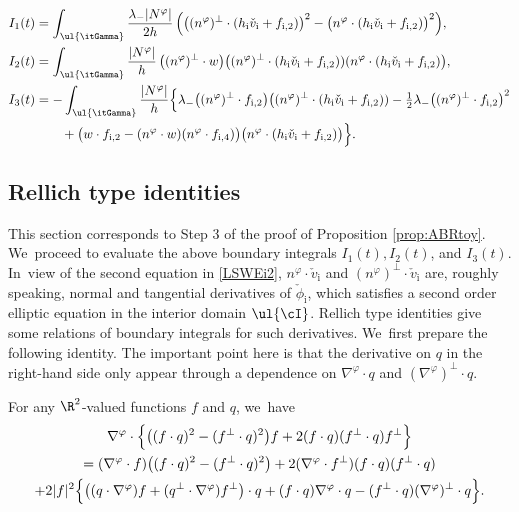 \begin{align*}
I_1(t)
&= \int_{\ul{\itGamma}}\frac{\lambda_-|N^\varphi|}{2h}\,
\Bigl(\bigl((n^\varphi)^\perp\cdot(h_\mathrm{i}\check{v}_\mathrm{i}+f_{{\rm i},2}) \bigr)^2 - \bigl(n^\varphi\cdot(h_\mathrm{i}\check{v}_\mathrm{i}+f_{{\rm i},2}) \bigr)^2 \Bigr), \\
I_2(t)
&= \int_{\ul{\itGamma}}\frac{|N^\varphi|}{h}\,
\bigl((n^\varphi)^\perp\cdot w \bigr) \bigl((n^\varphi)^\perp\cdot(h_\mathrm{i}\check{v}_\mathrm{i}+f_{{\rm i},2}))(n^\varphi\cdot(h_\mathrm{i}\check{v}_\mathrm{i}+f_{{\rm i},2}) \bigr), \\
I_3(t)
&= -\int_{\ul{\itGamma}}\frac{|N^\varphi|}{h}\Bigl\{
\lambda_- \bigl((n^\varphi)^\perp\cdot f_{{\rm i},2} \bigr) \bigl((n^\varphi)^\perp\cdot(h_\mathrm{i}\check{v}_\mathrm{i}+f_{{\rm i},2}))
- \tfrac12\lambda_- \bigl((n^\varphi)^\perp\cdot f_{{\rm i},2} \bigr)^2 \\
&\qquad
+ \bigl(w\cdot f_{{\rm i},2} - (n^\varphi\cdot w)(n^\varphi\cdot f_{{\rm i},4}) \bigr) \bigl(n^\varphi\cdot(h_\mathrm{i}\check{v}_\mathrm{i}+f_{{\rm i},2}) \bigr) \Bigr\}.
\end{align*}

\subsection{Rellich type identities}
This section corresponds to Step 3 of the proof of Proposition \ref{prop:ABRtoy}. We~proceed to evaluate the above boundary integrals $I_1(t),I_2(t)$, and $I_3(t)$. In~view of the second equation in \eqref{LSWEi2}, $n^\varphi\cdot \check{v}_\mathrm{i}$ and $(n^\varphi)^\perp\cdot \check{v}_\mathrm{i}$ are, roughly speaking,
normal and tangential derivatives of $\check{\phi}_\mathrm{i}$, which satisfies a second order elliptic equation in the interior domain $\ul{\cI}$.
Rellich type identities give some relations of boundary integrals for such derivatives. We~first prepare the following identity.
The important point here is that the derivative on $q$ in the right-hand side only appear through a dependence on $\nabla^\varphi\cdot q$
and $(\nabla^\varphi)^\perp\cdot q$.

\begin{lemma}\label{lem:Rellich1}
For any $\R^2$-valued functions $f$ and $q$, we~have
\begin{multline*}
\nabla^\varphi\cdot\Bigl\{ \bigl((f\cdot q)^2-(f^\perp\cdot q)^2 \bigr)f + 2(f\cdot q)(f^\perp\cdot q)f^\perp \Bigr\} \\
= (\nabla^\varphi\cdot f)\bigl((f\cdot q)^2-(f^\perp\cdot q)^2 \bigr) + 2(\nabla^\varphi\cdot f^\perp)(f\cdot q)(f^\perp\cdot q) \\
+ 2|f|^2\Bigl\{ \bigl((q\cdot\nabla^\varphi)f + (q^\perp\cdot\nabla^\varphi)f^\perp \bigr)\cdot q
+ (f\cdot q)\nabla^\varphi\cdot q - (f^\perp\cdot q)(\nabla^\varphi)^\perp\cdot q \Bigr\}.
\end{multline*}
\end{lemma}

